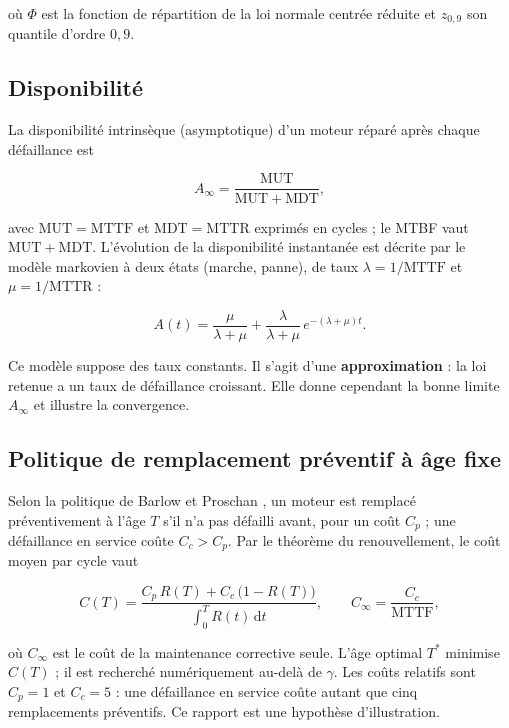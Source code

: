 où $\Phi$ est la fonction de répartition de la loi normale centrée réduite et $z_{0{,}9}$ son quantile d'ordre $0{,}9$.

\subsection{Disponibilité}

La disponibilité intrinsèque (asymptotique) d'un moteur réparé après chaque défaillance est

\begin{equation}\label{eq:dispo}
A_\infty = \frac{\mathrm{MUT}}{\mathrm{MUT} + \mathrm{MDT}},
\end{equation}

avec $\mathrm{MUT} = \mathrm{MTTF}$ et $\mathrm{MDT} = \mathrm{MTTR}$ exprimés en cycles ; le MTBF vaut $\mathrm{MUT} + \mathrm{MDT}$. L'évolution de la disponibilité instantanée est décrite par le modèle markovien à deux états (marche, panne), de taux $\lambda = 1/\mathrm{MTTF}$ et $\mu = 1/\mathrm{MTTR}$ :

\begin{equation}\label{eq:markov}
A(t) = \frac{\mu}{\lambda + \mu} + \frac{\lambda}{\lambda + \mu}\, e^{-(\lambda + \mu) t}.
\end{equation}

Ce modèle suppose des taux constants. Il s'agit d'une \textbf{approximation} : la loi retenue a un taux de défaillance croissant. Elle donne cependant la bonne limite $A_\infty$ et illustre la convergence.

\subsection{Politique de remplacement préventif à âge fixe}

Selon la politique de Barlow et Proschan \cite{barlow1965}, un moteur est remplacé préventivement à l'âge $T$ s'il n'a pas défailli avant, pour un coût $C_p$ ; une défaillance en service coûte $C_c > C_p$. Par le théorème du renouvellement, le coût moyen par cycle vaut

\begin{equation}\label{eq:cout}
C(T) = \frac{C_p\, R(T) + C_c\, \big(1 - R(T)\big)}{\displaystyle\int_0^T R(t)\, \mathrm{d}t}, \qquad C_\infty = \frac{C_c}{\mathrm{MTTF}} ,
\end{equation}

où $C_\infty$ est le coût de la maintenance corrective seule. L'âge optimal $T^*$ minimise $C(T)$ ; il est recherché numériquement au-delà de $\gamma$. Les coûts relatifs sont $C_p = 1$ et $C_c = 5$ : une défaillance en service coûte autant que cinq remplacements préventifs. Ce rapport est une hypothèse d'illustration.

